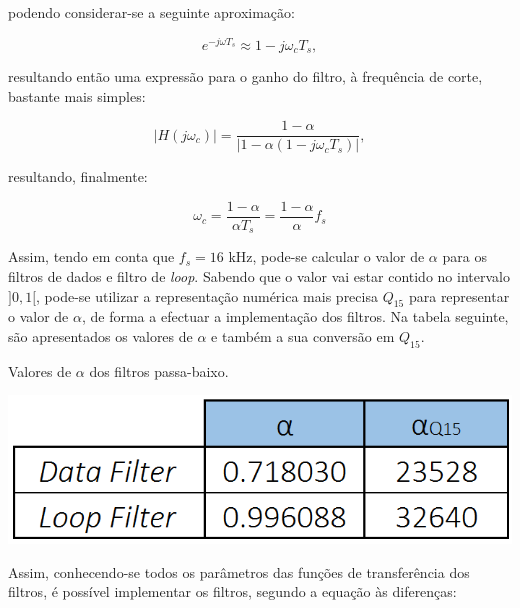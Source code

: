 \documentclass[11pt]{article}
\numberwithin{equation}{section}
\begin{document}
\vspace{1mm}
podendo considerar-se a seguinte aproximação:

\vspace{-3mm}
\begin{equation}
e^{-j\omega T_s} \approx 1 - j\omega_c T_s,
\end{equation} 

\vspace{1mm}
resultando então uma expressão para o ganho do filtro, à frequência de corte, bastante mais simples:

\vspace{-3mm}
\begin{equation}
|H(j\omega_c)| =  \frac{1 - \alpha}{|1-\alpha(1-j\omega_c T_s)|},
\end{equation} 

\vspace{1mm}
resultando, finalmente:

\vspace{-3mm}
\begin{equation}
\omega_c = \frac{1 - \alpha}{\alpha T_s} = \frac{1 - \alpha}{\alpha} f_s
\label{eq:alfa}
\end{equation} 

\vspace{1mm}
Assim, tendo em conta que $f_s = 16$ kHz, pode-se calcular o valor de $\alpha$ para os filtros de dados e filtro de \textit{loop}. Sabendo que o valor vai estar contido no intervalo $]0,1[$, pode-se utilizar a representação numérica mais precisa $Q_{15}$ para representar o valor de $\alpha$, de forma a efectuar a implementação dos filtros. Na tabela seguinte, são apresentados os valores de $\alpha$ e também a sua conversão em $Q_{15}$.

\begin{table}[H]
	\centering
	\caption{Valores de $\alpha$ dos filtros passa-baixo.}
	\vspace{-1.5mm}
	\includegraphics[keepaspectratio=true, scale=0.35]{tabelas/alphas}
\end{table}

Assim, conhecendo-se todos os parâmetros das funções de transferência dos filtros, é possível implementar os filtros, segundo a equação às diferenças:
\end{document}
